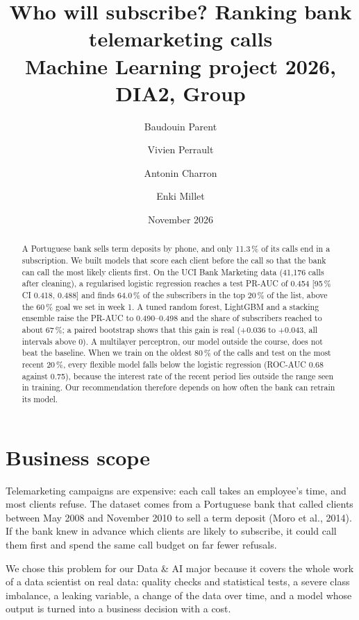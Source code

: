 \documentclass[11pt,a4paper]{article}
\title{\textbf{Who will subscribe? Ranking bank telemarketing calls}\\[4pt]
\large Machine Learning project 2026, DIA2, Group \groupid}
\author{Baudouin Parent \and Vivien Perrault \and Antonin Charron \and Enki Millet}
\date{November 2026}
\begin{document}
\maketitle

\begin{abstract}
A Portuguese bank sells term deposits by phone, and only 11.3\,\% of its calls end in a subscription. We built
models that score each client before the call so that the bank can call the most likely clients first. On the UCI
Bank Marketing data (41,176 calls after cleaning), a regularised logistic regression reaches a test PR-AUC of 0.454
[95\,\% CI 0.418, 0.488] and finds 64.0\,\% of the subscribers in the top 20\,\% of the list, above the 60\,\% goal we
set in week 1. A tuned random forest, LightGBM and a stacking ensemble raise the PR-AUC to 0.490--0.498 and the share
of subscribers reached to about 67\,\%; a paired bootstrap shows that this gain is real (+0.036 to +0.043, all
intervals above 0). A multilayer perceptron, our model outside the course, does not beat the baseline. When we train
on the oldest 80\,\% of the calls and test on the most recent 20\,\%, every flexible model falls below the logistic
regression (ROC-AUC 0.68 against 0.75), because the interest rate of the recent period lies outside the range seen
in training. Our recommendation therefore depends on how often the bank can retrain its model.
\end{abstract}

\tableofcontents
\newpage

\section{Business scope}

Telemarketing campaigns are expensive: each call takes an employee's time, and most clients refuse. The dataset
comes from a Portuguese bank that called clients between May 2008 and November 2010 to sell a term deposit
(Moro et al., 2014). If the bank knew in advance which clients are likely to subscribe, it could call them first and
spend the same call budget on far fewer refusals.

We chose this problem for our Data \& AI major because it covers the whole work of a data scientist on real data:
quality checks and statistical tests, a severe class imbalance, a leaking variable, a change of the data over time,
and a model whose output is turned into a business decision with a cost.
\end{document}
